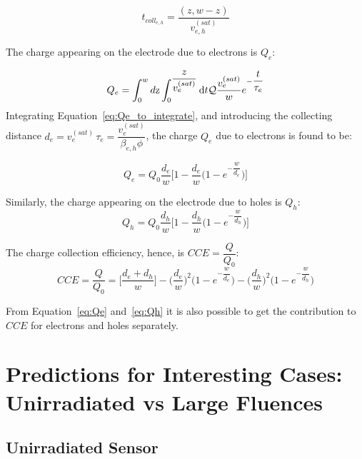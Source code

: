 \begin{equation}
t_{coll_{e,h}}=\dfrac{(z,w-z)}{v^{(sat)}_{e,h}}
\end{equation}

The charge appearing on the electrode due to electrons  is $Q_e$:

\begin{equation}
Q_e = \int_0^wd{\rm z}\int_0^{\dfrac{z}{v^{(sat)}_{e}}}{\rm d}t\mathcal{Q}\dfrac{v^{(sat)}_{e}}{w}e^{-\dfrac{t}{\tau_{e}}}
\label{eq:Qe_to_integrate}
\end{equation}
Integrating Equation~\ref{eq:Qe_to_integrate}, and introducing the collecting distance $d_e=v^{(sat)}_{e}\,\tau_{e}=\dfrac{v^{(sat)}_{e}}{\beta_{e,h}\phi}$, the charge  $Q_e$ due to electrons is found to be:

\begin{equation}
Q_e=Q_0\dfrac{d_e}{w}\Big[1-\dfrac{d_e}{w}\Big(1-e^{-\dfrac{w}{d_e}}\Big)\Big]
\label{eq:Qe}
\end{equation}

Similarly, the charge appearing on the electrode due to holes is $Q_h$:
\begin{equation}
Q_h=Q_0\dfrac{d_h}{w}\Big[1-\dfrac{d_h}{w}\Big(1-e^{-\dfrac{w}{d_h}}\Big)\Big]
\label{eq:Qh}
\end{equation}

The charge collection efficiency, hence, is  $CCE=\dfrac{Q}{Q_0}$:
\begin{equation}
CCE=\dfrac{Q}{Q_0}=\Big[\dfrac{d_e+d_h}{w}\Big]-\Big(\dfrac{d_e}{w}\Big)^2\Big(1-e^{-\dfrac{w}{d_e}}\Big)-\Big(\dfrac{d_h}{w}\Big)^2\Big(1-e^{-\dfrac{w}{d_h}}\Big)
\label{eq:CCE}
\end{equation}

From Equation~\ref{eq:Qe} and~\ref{eq:Qh} it is also possible to get the contribution to $CCE$ 
for electrons and holes separately. 

\section{Predictions for Interesting Cases: Unirradiated vs Large Fluences}

\subsection{Unirradiated Sensor}

